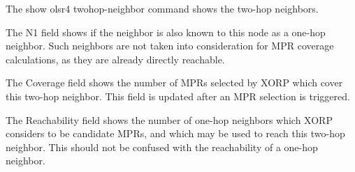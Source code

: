 \vspace{0.1in}
\noindent{}

The {\stt show olsr4 twohop-neighbor} command shows the two-hop neighbors.

The N1 field shows if the neighbor is also known to this node as a one-hop
neighbor. Such neighbors are not taken into consideration for MPR coverage
calculations, as they are already directly reachable.

The Coverage field shows the number of MPRs selected by XORP which cover this
two-hop neighbor. This field is updated after an MPR selection is triggered.

The Reachability field shows the number of one-hop neighbors which XORP considers
to be candidate MPRs, and which may be used to reach this two-hop neighbor. This
should not be confused with the reachability of a one-hop neighbor.

\vspace{0.1in}
\noindent{}
